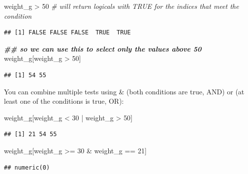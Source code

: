 \documentclass[
]{book}
\newenvironment{Shaded}{\begin{snugshade}}{\end{snugshade}}
\newcommand{\CommentTok}[1]{\textcolor[rgb]{0.56,0.35,0.01}{\textit{#1}}}
\newcommand{\DecValTok}[1]{\textcolor[rgb]{0.00,0.00,0.81}{#1}}
\newcommand{\DocumentationTok}[1]{\textcolor[rgb]{0.56,0.35,0.01}{\textbf{\textit{#1}}}}
\newcommand{\NormalTok}[1]{#1}
\newcommand{\SpecialCharTok}[1]{\textcolor[rgb]{0.00,0.00,0.00}{#1}}
\begin{document}
\begin{Shaded}
\begin{Highlighting}[]
\NormalTok{weight\_g }\SpecialCharTok{\textgreater{}} \DecValTok{50}    \CommentTok{\# will return logicals with TRUE for the indices that meet the condition}
\end{Highlighting}
\end{Shaded}

\begin{verbatim}
## [1] FALSE FALSE FALSE  TRUE  TRUE
\end{verbatim}

\begin{Shaded}
\begin{Highlighting}[]
\DocumentationTok{\#\# so we can use this to select only the values above 50}
\NormalTok{weight\_g[weight\_g }\SpecialCharTok{\textgreater{}} \DecValTok{50}\NormalTok{]}
\end{Highlighting}
\end{Shaded}

\begin{verbatim}
## [1] 54 55
\end{verbatim}

You can combine multiple tests using \& (both conditions are true, AND) or \textbar{} (at least one of the conditions is true, OR):

\begin{Shaded}
\begin{Highlighting}[]
\NormalTok{weight\_g[weight\_g }\SpecialCharTok{\textless{}} \DecValTok{30} \SpecialCharTok{|}\NormalTok{ weight\_g }\SpecialCharTok{\textgreater{}} \DecValTok{50}\NormalTok{]}
\end{Highlighting}
\end{Shaded}

\begin{verbatim}
## [1] 21 54 55
\end{verbatim}

\begin{Shaded}
\begin{Highlighting}[]
\NormalTok{weight\_g[weight\_g }\SpecialCharTok{\textgreater{}=} \DecValTok{30} \SpecialCharTok{\&}\NormalTok{ weight\_g }\SpecialCharTok{==} \DecValTok{21}\NormalTok{]}
\end{Highlighting}
\end{Shaded}

\begin{verbatim}
## numeric(0)
\end{verbatim}
\end{document}
